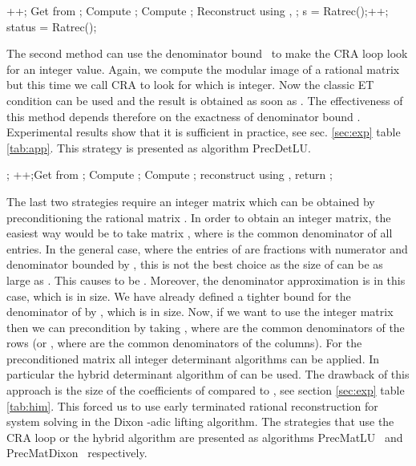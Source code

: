 \documentclass{acm_proc_article-sp}   \usepackage{graphicx,url}
\newcommand{\algrdRat}{RatLU}
\newcommand{\algrdDet}{PrecDetLU}
\newcommand{\algrdMat}{PrecMatLU}
\newcommand{\algrdDixon}{PrecMatDixon}
\begin{document}
\begin{algorithm}\caption{\algrdRat}
\begin{algorithmic}[1]
\STATE 
\REPEAT
\STATE ++; Get  from ;
\STATE Compute ;
\STATE Compute ;
\STATE Reconstruct  using , ;
\IF {}
    \STATE s = Ratrec();++;
\ENDIF
\UNTIL{}
    \STATE status = Ratrec();
\end{algorithmic}
\end{algorithm}

The second method can use the denominator bound~ to make the
CRA loop look for an integer value. Again, we compute the modular
image of a rational matrix  but this time we call CRA to
look for  which is integer. Now the classic ET
condition can be used and the result is obtained as soon
as . The effectiveness of this method depends
therefore on the exactness of denominator bound . Experimental
results show that it is sufficient in practice, see sec. \ref{sec:exp}
table \ref{tab:app}. This strategy is presented as algorithm \algrdDet.

\begin{algorithm}\caption{\algrdDet}
\begin{algorithmic}[1]
\STATE ; \REPEAT \STATE ++;Get  from ;
\STATE Compute ; \STATE Compute ; \STATE reconstruct  using ,   \UNTIL{} \STATE return ;
\end{algorithmic}
\end{algorithm}

The last two strategies require an integer matrix  which can be obtained by preconditioning the rational matrix . In order to obtain an integer matrix, the easiest way would be to take matrix , where  is the common denominator of all entries. In the general case, where the entries of  are fractions  with numerator and denominator bounded by , this is not the best choice as the size of  can be as large as . This causes  to be . Moreover, the denominator approximation is  in this case, which is  in size. We have already defined a tighter bound for the denominator of  by , which is  in size. Now, if we want to use the integer matrix  then we can precondition  by taking , where  are the common denominators of the rows (or , where  are the common denominators of the columns).
For the preconditioned matrix  all integer determinant
algorithms can be applied. In particular the hybrid determinant
algorithm of \cite{jgd:2006:det} can be used. The drawback of this
approach is the size of the coefficients of  compared to
, see section \ref{sec:exp} table \ref{tab:him}. This forced us
to use early terminated rational reconstruction for system solving
in the Dixon -adic lifting algorithm. The strategies that use the
CRA loop or the hybrid algorithm are presented as algorithms
\algrdMat~ and \algrdDixon~ respectively.
\end{document}
